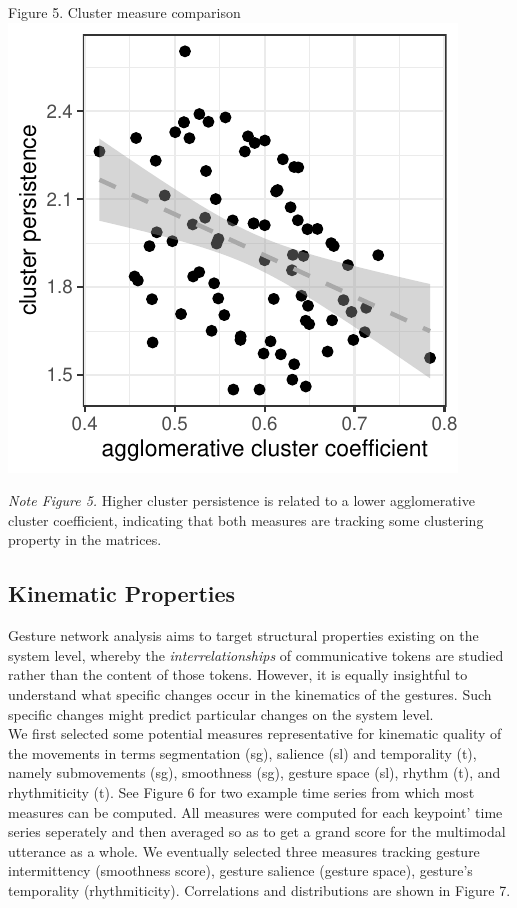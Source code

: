 \documentclass[
  man, noextraspace,floatsintext]{apa6}
\begin{document}
Figure 5. Cluster measure comparison\\
\includegraphics{GNet_WP_files/figure-latex/network_manip_check2-1.pdf}

\emph{Note Figure 5.} Higher cluster persistence is related to a lower agglomerative cluster coefficient, indicating that both measures are tracking some clustering property in the matrices.

\hypertarget{kinematic-properties}{%
\subsection{Kinematic Properties}\label{kinematic-properties}}

Gesture network analysis aims to target structural properties existing on the system level, whereby the \emph{interrelationships} of communicative tokens are studied rather than the content of those tokens. However, it is equally insightful to understand what specific changes occur in the kinematics of the gestures. Such specific changes might predict particular changes on the system level.\\
We first selected some potential measures representative for kinematic quality of the movements in terms segmentation (sg), salience (sl) and temporality (t), namely submovements (sg), smoothness (sg), gesture space (sl), rhythm (t), and rhythmiticity (t). See Figure 6 for two example time series from which most measures can be computed. All measures were computed for each keypoint' time series seperately and then averaged so as to get a grand score for the multimodal utterance as a whole. We eventually selected three measures tracking gesture intermittency (smoothness score), gesture salience (gesture space), gesture's temporality (rhythmiticity). Correlations and distributions are shown in Figure 7.
\end{document}
